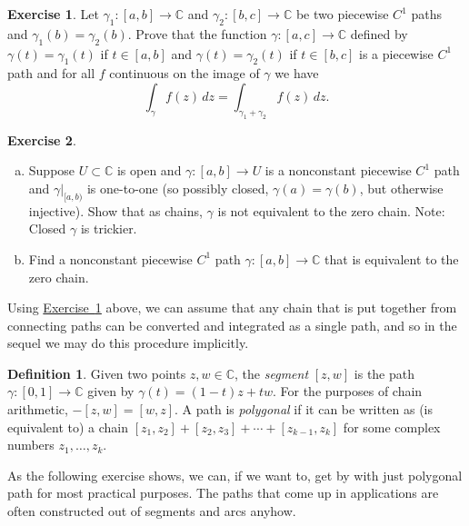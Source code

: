 \documentclass[12pt,openany]{book}
\newcommand{\C}{{\mathbb{C}}}
\newcommand{\myindex}[1]{#1\index{#1}}
\theoremstyle{plain}
\theoremstyle{remark}
\theoremstyle{definition}
\newtheorem{defn}[thm]{Definition}
\newenvironment{exbox}{%
    \def\FrameCommand{\vrule width 1pt \relax\hspace{10pt}}%
    \MakeFramed{\advance\hsize-\width\FrameRestore}%
}{%
    \endMakeFramed
}
\newenvironment{exparts}{%
    \leavevmode\begin{enumerate}[a),noitemsep,topsep=0pt,parsep=0pt,partopsep=0pt]
}{%
    \end{enumerate}
}
\theoremstyle{exercise}
\newtheorem{exercise}{Exercise}[section]
\theoremstyle{example}
\newcommand{\exerciseref}[1]{\hyperref[#1]{Exercise~\ref*{#1}}}
\begin{document}
\begin{exbox}
\begin{exercise} \label{exercise:pathsum}
Let $\gamma_1 \colon [a,b] \to \C$ and $\gamma_2 \colon [b,c] \to \C$
be two piecewise $C^1$ paths and $\gamma_1(b)=\gamma_2(b)$.
Prove that the function $\gamma \colon [a,c] \to
\C$ defined by $\gamma(t) = \gamma_1(t)$ if $t \in [a,b]$ and $\gamma(t)
= \gamma_2(t)$ if $t \in [b,c]$ is a piecewise $C^1$ path and
for all $f$ continuous on the image of $\gamma$ we have
\begin{equation*}
\int_{\gamma} f(z)\,dz = \int_{\gamma_1 + \gamma_2} f(z) \, dz .
\end{equation*}
\end{exercise}

\begin{exercise} \label{exercise:nonconstantnonzerochain}
\begin{exparts}
\item
Suppose $U \subset \C$ is open and
$\gamma \colon [a,b] \to U$
is a nonconstant piecewise $C^1$
path and $\gamma|_{[a,b)}$ is one-to-one (so possibly closed,
$\gamma(a)=\gamma(b)$,
but otherwise injective).  Show that as chains, $\gamma$ is not equivalent to the zero chain.
Note: Closed $\gamma$ is trickier.
\item
Find a nonconstant piecewise $C^1$ path $\gamma \colon [a,b] \to \C$ that is
equivalent to the zero chain.
\end{exparts}
\end{exercise}
\end{exbox}

Using \exerciseref{exercise:pathsum} above,
we can assume that any chain that is put together
from connecting paths can be converted and integrated as a single path,
and so in the sequel we may do this procedure implicitly.

\begin{defn}
Given two points $z,w \in \C$, the \emph{\myindex{segment}} $[z,w]$ is the path
$\gamma \colon [0,1] \to \C$ given by $\gamma(t) = (1-t)z + tw$.
For the purposes of chain arithmetic, $-[z,w] = [w,z]$.
A path is \emph{\myindex{polygonal}} if it can be written as
(is equivalent to) a chain
$[z_1,z_2] + [z_2,z_3] + \cdots + [z_{k-1},z_k]$ for some complex numbers
$z_1,\ldots,z_k$.
\end{defn}

As the following exercise shows, we can, if we want to, get by
with just polygonal path for most practical purposes.
The paths that come up in applications are often constructed out of
segments and arcs anyhow.
\end{document}
